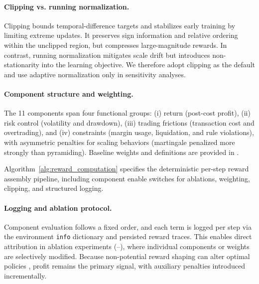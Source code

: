 \paragraph{Clipping vs. running normalization.}
Clipping bounds temporal-difference targets and stabilizes early training by limiting extreme updates. It preserves sign information and relative ordering within the unclipped region, but compresses large-magnitude rewards. In contrast, running normalization mitigates scale drift but introduces non-stationarity into the learning objective. We therefore adopt clipping as the default and use adaptive normalization only in sensitivity analyses.

\paragraph{Component structure and weighting.}
The 11 components span four functional groups: 
(i) return (post-cost profit), 
(ii) risk control (volatility and drawdown), 
(iii) trading frictions (transaction cost and overtrading), and 
(iv) constraints (margin usage, liquidation, and rule violations), 
with asymmetric penalties for scaling behaviors (martingale penalized more strongly than pyramiding). 
Baseline weights and definitions are provided in .



Algorithm~\ref{alg:reward_computation} specifies the deterministic per-step reward assembly pipeline, including component enable switches for ablations, weighting, clipping, and structured logging.



\paragraph{Logging and ablation protocol.}
Component evaluation follows a fixed order, and each term is logged per step via the environment \texttt{info} dictionary and persisted reward traces. This enables direct attribution in ablation experiments (--), where individual components or weights are selectively modified. Because non-potential reward shaping can alter optimal policies \citep{ng1999policy}, profit remains the primary signal, with auxiliary penalties introduced incrementally.


